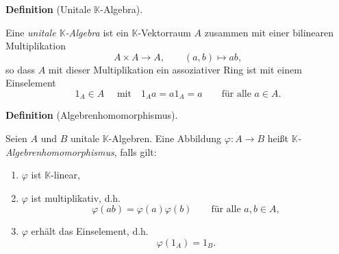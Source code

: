 \documentclass[10pt, letterpaper]{article}
\newcommand{\CustomHeading}[3]{%
  \par\medskip\noindent%
  \textbf{#1 #2} \textnormal{(#3)}.\enskip%
}
\newenvironment{DEF}[2]{\CustomHeading{Definition}{#1}{#2}}{}
\begin{document}
\begin{DEF}{}{Unitale $\mathbb{K}$-Algebra}
Eine \emph{unitale $\mathbb{K}$-Algebra} ist ein $\mathbb{K}$-Vektorraum $A$ zusammen mit
einer bilinearen Multiplikation
\[
A\times A\to A,\qquad (a,b)\mapsto ab,
\]
so dass $A$ mit dieser Multiplikation ein assoziativer Ring ist mit einem Einselement
\[
1_A\in A \quad \text{ mit}\quad 1_Aa=a1_A=a
\qquad\text{für alle }a\in A.
\]
\end{DEF}

\begin{DEF}{}{Algebrenhomomorphismus}
Seien $A$ und $B$ unitale $\mathbb{K}$-Algebren. Eine Abbildung $\varphi:A\to B$
heißt \emph{$\mathbb{K}$-Algebrenhomomorphismus}, falls gilt:
\begin{enumerate}
    \item \(\varphi\) ist \(\mathbb{K}\)-linear,
    \item \(\varphi\) ist multiplikativ, d.h.
    \[
    \varphi(ab)=\varphi(a)\varphi(b)
    \qquad\text{für alle }a,b\in A,
    \]
    \item \(\varphi\) erhält das Einselement, d.h.
    \[
    \varphi(1_A)=1_B.
    \]
\end{enumerate}
\end{DEF}
\end{document}

